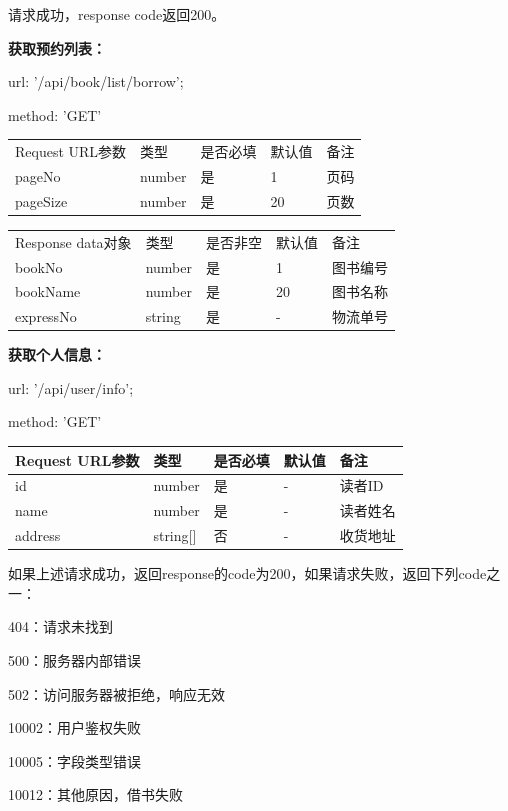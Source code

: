 请求成功，response code返回200。

\textbf{获取预约列表：}

url: '/api/book/list/borrow';

method: 'GET'

\begin{tabular}{lllll}
    \hline
    Request URL参数& 类型& 是否必填& 默认值 & 备注\\
    
    pageNo & number & 是& 1& 页码\\
    
    pageSize & number & 是& 20& 页数\\
    \hline
\end{tabular}

\begin{tabular}{lllll}
    \hline
    Response data对象& 类型& 是否非空& 默认值 & 备注\\
    
    bookNo & number & 是& 1& 图书编号\\
    
    bookName & number& 是& 20& 图书名称\\
    
    expressNo& string& 是& -& 物流单号\\
    \hline
\end{tabular}

\textbf{获取个人信息：}

url: '/api/user/info';

method: 'GET'

\begin{tabular}{|l|l|l|l|l|}
    \hline
    Request URL参数& 类型& 是否必填& 默认值 & 备注\\
    \hline
    id & number & 是& -& 读者ID\\
    \hline
    name & number & 是& -& 读者姓名\\
    \hline
    address & string[] & 否& -& 收货地址\\
    \hline
\end{tabular}

如果上述请求成功，返回response的code为200，如果请求失败，返回下列code之一：

404：请求未找到

500：服务器内部错误

502：访问服务器被拒绝，响应无效

10002：用户鉴权失败

10005：字段类型错误

10012：其他原因，借书失败


